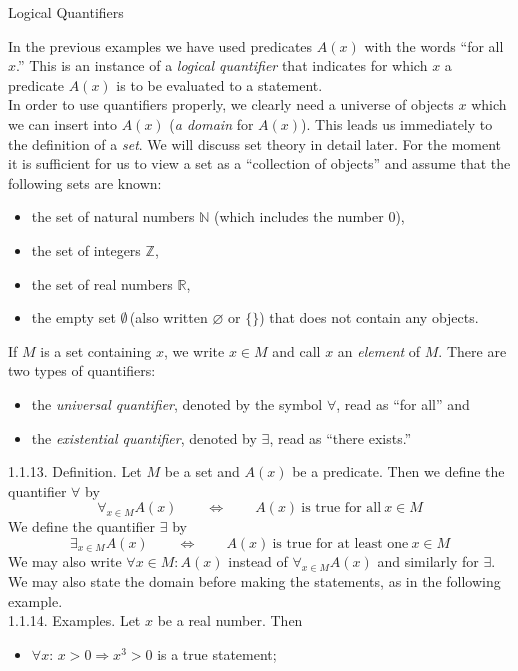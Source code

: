 \documentclass[smaller,hyperref={CJKbookmarks=true}]{beamer}
\newcommand{\N}{\mathbb{N}} \newcommand{\Z}{\mathbb{Z}} \newcommand{\Q}{\mathbb{Q}}
\newcommand{\R}{\mathbb{R}}
\begin{document}
\begin{frame}{Logical Quantifiers}
\begin{spacing}{1.05}
In the previous examples we have used predicates $A(x)$ with the words ``for all $x$.'' This is an instance of a \emph{logical quantifier} that indicates for which $x$ a predicate $A(x)$ is to be evaluated to a statement.\\[5pt]
In order to use quantifiers properly, we clearly need a universe of objects $x$ which we can insert into $A(x)$ (\emph{a domain} for $A(x)$). This leads us immediately to the definition of a \emph{set}. We will discuss set theory in detail later. For the moment it is suf{}ficient for us to view a set as a ``collection of objects'' and assume that the following sets are known:
\begin{itemize}
  \item the set of natural numbers $\N$ (which includes the number 0),
  \item the set of integers $\Z$,
  \item the set of real numbers $\R$,
  \item the empty set $\emptyset$\,(also written $\varnothing$ or $\{\}$) that does not contain any objects.
\end{itemize}
If $M$ is a set containing $x$, we write $x\in M$ and call $x$ an \emph{element} of $M$.
\newpage
There are two types of quantifiers:
\begin{itemize}
  \item the \emph{universal quantifier}, denoted by the symbol $\forall$, read as ``for all'' and
  \item the \emph{existential quantifier}, denoted by $\exists$, read as ``there exists.''
\end{itemize}
\alert{1.1.13. Definition.} Let $M$ be a set and $A(x)$ be a predicate. Then we define the quantifier $\forall$ by
\[\mathop{\forall}_{x\in M}A(x)\qquad\Leftrightarrow\qquad
A(x)~\text{is true for all}~x\in M\]
We define the quantifier $\exists$ by
\[\mathop{\exists}_{x\in M}A(x)\qquad\Leftrightarrow\qquad
A(x)~\text{is true for at least one}~x\in M\]
We may also write $\forall x\in M\!:A(x)$ instead of $\displaystyle\mathop{\forall}_{x\in M}A(x)$ and similarly for $\exists$.
\newpage
We may also state the domain before making the statements, as in the
following example.\\[5pt]
\alert{1.1.14. Examples.} Let $x$ be a real number. Then
\begin{itemize}
  \item $\forall x\!:\,x>0\Rightarrow x^3>0$ is a true statement;

\end{itemize}
\end{spacing}
\end{frame}
\end{document}
